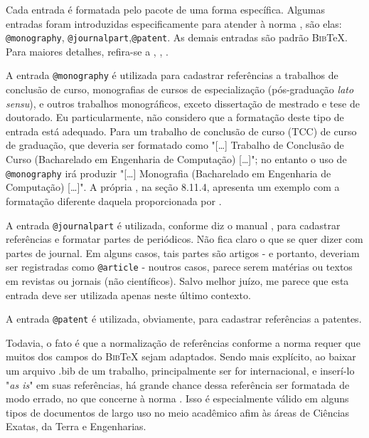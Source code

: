 \begin{apendicesenv}
Cada entrada é formatada pelo pacote  de uma forma específica. Algumas entradas foram introduzidas especificamente para atender à norma , são elas: \verb|@monography|, \verb|@journalpart|,\verb|@patent|. As demais entradas são padrão \textsc{Bib}\TeX{}. Para maiores detalhes, refira-se a , , .

A entrada \verb|@monography| é utilizada para cadastrar referências a trabalhos de conclusão de curso, monografias de cursos de especialização (pós-graduação \textit{lato sensu}), e outros trabalhos monográficos, exceto dissertação de mestrado e tese de doutorado. Eu particularmente, não considero que a formatação deste tipo de entrada está adequado. Para um trabalho de conclusão de curso (TCC) de curso de graduação, que deveria ser formatado como "[\ldots] Trabalho de Conclusão de Curso (Bacharelado em Engenharia de Computação) [\ldots]"{}; no entanto o uso de \verb|@monography| irá produzir "[\ldots] Monografia (Bacharelado em Engenharia de Computação) [\ldots]"{}. A própria  , na seção 8.11.4, apresenta um exemplo com a formatação diferente daquela proporcionada por .

A entrada \verb|@journalpart| é utilizada, conforme diz o manual \cite{abnTeX22014d}, para cadastrar referências e formatar partes de periódicos. Não fica claro o que se quer dizer com partes de journal. Em alguns casos, tais partes são artigos - e portanto, deveriam ser registradas como \verb|@article| - noutros casos, parece serem matérias ou textos em revistas ou jornais (não científicos). Salvo melhor juízo, me parece que esta entrada deve ser utilizada apenas neste último contexto.

A entrada \verb|@patent| é utilizada, obviamente, para cadastrar referências a patentes.

Todavia, o fato é que a normalização de referências conforme a norma  requer que muitos dos campos do \textsc{Bib}\TeX{} sejam adaptados. Sendo mais explícito, ao baixar um arquivo {\ttfamily .bib} de um trabalho, principalmente ser for internacional, e inserí-lo "\textit{as is}"{} em suas referências, há grande chance dessa referência ser formatada de modo errado, no que concerne à norma . Isso é especialmente válido em alguns tipos de documentos de largo uso no meio acadêmico afim às áreas de Ciências Exatas, da Terra e Engenharias.


\end{apendicesenv}
